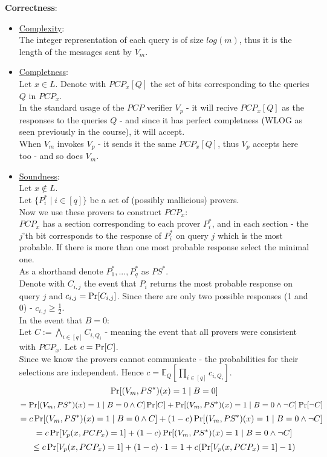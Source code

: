 \textbf{Correctness}:
\begin{itemize}
	\item \underline{Complexity}:\\
		The integer representation of each query is of size $log(m)$,
		thus it is the length of the messages sent by $V_m$.
	\item \underline{Completness}:\\
		Let $x\in L$. Denote with $PCP_x[Q]$ the set of bits
		corresponding to the queries $Q$ in $PCP_x$.\\
		In the standard usage of the $PCP$ verifier $V_p$ - 
		it will recive $PCP_x[Q]$ as the responses to the queries $Q$ - 
		and since it has perfect completness (WLOG as seen previously in the course),
		it will accept.\\
		When $V_m$ invokes $V_p$ - it sends it the same $PCP_x[Q]$,
		thus $V_p$ accepts here too - and so does $V_m$.
	\item \underline{Soundness}:\\
		Let $x\notin L$.\\
		Let $\{P_i^*\mid i\in[q]\}$ be a set of (possibly mallicious) provers.\\
		
		Now we use these provers to construct $PCP_x$:\\
		$PCP_x$ has a section corresponding to each prover $P_i^*$, and in each section - 
		the $j$'th bit corresponds to the response of $P_i^*$ on query $j$ which
		is the most probable. If there is more than one most probable response
		select the minimal one.\\

		As a shorthand denote $P_1^*,...,P_q^*$ as $PS^*$.\\

		Denote with $C_{i,j}$ the event that $P_i$ returns the most
		probable response on query $j$ and $c_{i,j}=\operatorname*{Pr}[C_{i,j}]$.
		Since there are only two possible
		responses (1 and 0) - $c_{i,j}\geq\frac{1}{2}$.\\

		In the event that $B=0$:\\
		Let $C:= \bigwedge_{i\in [q]}C_{i,Q_i}$ - meaning the event that
		all provers were consistent with $PCP_x$. Let $c=\operatorname*{Pr}[C]$.\\
		Since we know the provers cannot communicate - the probabilities for their
		selections are independent. Hence $c=\mathbb{E}_Q[\prod_{i\in [q]}c_{i,Q_i}]$.
		\[
			\operatorname*{Pr}[(V_m,PS^*)(x)=1\mid B=0]	
		\]
		\[
			=\operatorname*{Pr}[(V_m,PS^*)(x)=1\mid B=0\wedge C]\operatorname*{Pr}[C]
			+\operatorname*{Pr}[(V_m,PS^*)(x)=1\mid B=0\wedge \neg C]\operatorname*{Pr}[\neg C]
		\]
		\[
			=c\operatorname*{Pr}[(V_m,PS^*)(x)=1\mid B=0\wedge C]
			+(1-c)\operatorname*{Pr}[(V_m,PS^*)(x)=1\mid B=0\wedge \neg C]
		\]
		\[
			=c\operatorname*{Pr}[V_p(x, PCP_x)=1]
			+(1-c)\operatorname*{Pr}[(V_m,PS^*)(x)=1\mid B=0\wedge \neg C]
		\]
		\[
			\leq c\operatorname*{Pr}[V_p(x, PCP_x)=1]+(1-c)\cdot 1
			=1+c(\operatorname*{Pr}[V_p(x, PCP_x)=1]-1)
		\]


\end{itemize}
